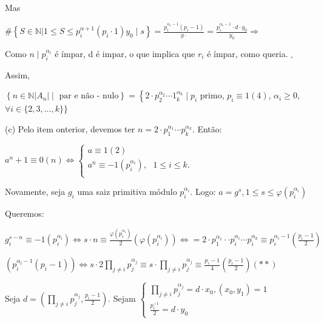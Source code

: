 \documentclass[a4paper,12pt]{article}
\renewcommand{\leq}{\ensuremath{\leqslant}}
\renewcommand{\geq}{\ensuremath{\geqslant}}
\theoremstyle{plain} %
\theoremstyle{definition} %
\theoremstyle{remark} %
\begin{document}
\begin{framed}
		Mas
		
		$\#\left\{S \in \mathds{N} | 1 \leq S \leq p_{i}^{\alpha+1}\left(p_{i} \cdot 1\right)\right. \left.y_{0} \mid s\right\}=\frac{p_{i}^{\alpha_i-1}\left(p_{i}-1\right)}{y \cdot}=\frac{p_{i}^{\alpha_{i}-1} \cdot d \cdot y_{0}}{y_{0}} \Rightarrow$ 
		
		Como $n \mid p_{i}^{\alpha_{i}}$ \'e \'impar, d \'e impar, o que implica que $r_i$ \'e \'impar, como queria. $_\square$
		
		Assim, 
		
		$\left\{n \in \mathds{N}|A_{n}| \mid \text{ par e n\~ao - nulo}\right\}=\left\{2 \cdot p_{2}^{\alpha_{2}} \cdots 1_{k}^{\alpha_{k}} \mid p_{i}\right.$ primo, $p_i\equiv 1(4)$, $\alpha_i\geq0$, $\forall i \in\{2,3, \dotso, k\}\}$
		
		(c) Pelo item onterior, devemos ter $n=2 \cdot p_{1}^{\alpha_{1}}\cdots p_{k}^{\alpha_{k}}$. Ent\~ao:
		
		$a^{n}+1 \equiv 0(n) \Leftrightarrow\left\{\begin{array}{l}
			a \equiv 1(2) \\ 
			a^{n} \equiv-1 (p_{i}^{\alpha_i}), \text{ }1\leq i\leq k.\\
		\end{array}\right.$
		
		\vspace{1em}
		Novamente, seja $g_i$ uma saiz primitiva m\'odulo $p_{i}^{\alpha_i}$. Logo: $a=g^{s}, 1 \leq s \leq \varphi\left(p_i^{\alpha_{i}}\right)$
		
		Queremos:
		
		$g_{i}^{s-n} \equiv-1\left(p_{i}^{\alpha_{i}}\right) \Leftrightarrow s \cdot n \equiv \frac{\varphi\left(p_{i}^{\alpha_{i}}\right)}{2}\left(\varphi\left(p_{i}^{\alpha_{i}}\right)\right) \Leftrightarrow=2 \cdot p_{1}^{\alpha_{1}} \cdot \cdot p_{i}^{\alpha_{i}} \cdots p_{i}^{\alpha_{k}} \equiv p_{i}^{\alpha_{i}-1}\left(\frac{p_{i}-1}{2}\right)$
		
		$\left(p_{i}^{\alpha_{t}-1}\left(p_{i}-1\right)\right) \Leftrightarrow s \cdot 2 \prod\limits_{j \neq i} p_{j}^{\alpha_{j}} \equiv s \cdot \prod\limits_{j \neq i} p_{j}^{\alpha_{j}} \equiv \frac{p_{i}-1}{4}\left(\frac{p_{i}-1}{2}\right)(\ast\ast)$
		
		Seja $\displaystyle d=\left(\prod\limits_{j \neq i} p_{j}^{\alpha_{j}}, \frac{p_{i}-1}{2}\right)$. Sejam $\displaystyle\left\{\begin{array}{l}\prod\limits_{j \neq i} p_{j}^{\alpha_{j}}=d \cdot x_{0},\left(x_{0}, y_{1}\right)=1 \\ \frac{p_{i}^{-1}}{2}=d \cdot y_{0}\end{array}\right.$
		

\end{framed}
\end{document}
